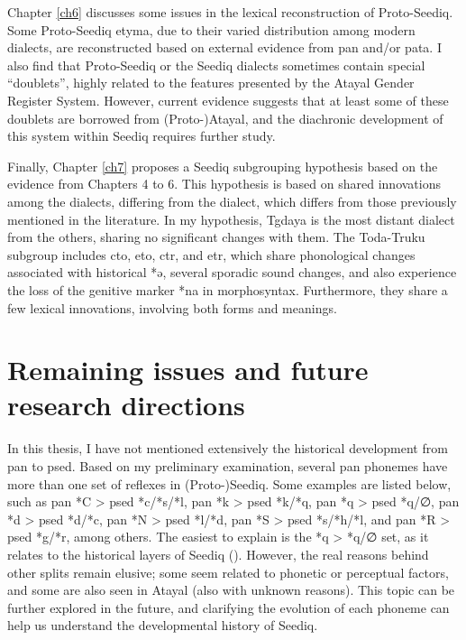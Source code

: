 Chapter \ref{ch6} discusses some issues in the lexical reconstruction of Proto-Seediq. Some Proto-Seediq etyma, due to their varied distribution among modern dialects, are reconstructed based on external evidence from \acl{pan} and/or \acl{pata}. I also find that Proto-Seediq or the Seediq dialects sometimes contain special ``doublets'', highly related to the features presented by the Atayal Gender Register System. However, current evidence suggests that at least some of these doublets are borrowed from (Proto-)Atayal, and the diachronic development of this system within Seediq requires further study.

Finally, Chapter \ref{ch7} proposes a Seediq subgrouping hypothesis based on the evidence from Chapters 4 to 6. This hypothesis is based on shared innovations among the dialects, differing from the dialect, which differs from those previously mentioned in the literature. In my hypothesis, Tgdaya is the most distant dialect from the others, sharing no significant changes with them. The Toda-Truku subgroup includes \acl{cto}, \acl{eto}, \acl{ctr}, and \acl{etr}, which share phonological changes associated with historical *ə, several sporadic sound changes, and also experience the loss of the genitive marker *na in morphosyntax. Furthermore, they share a few lexical innovations, involving both forms and meanings.

\section{Remaining issues and future research directions}

In this thesis, I have not mentioned extensively the historical development from \acl{pan} to \acl{psed}. Based on my preliminary examination, several \ac{pan} phonemes have more than one set of reflexes in (Proto-)Seediq. Some examples are listed below, such as \ac{pan} *C > \ac{psed} *c/*s/*l, \ac{pan} *k > \ac{psed} *k/*q, \ac{pan} *q > \ac{psed} *q/∅, \ac{pan} *d > \ac{psed} *d/*c, \ac{pan} *N > \ac{psed} *l/*d, \ac{pan} *S > \ac{psed} *s/*h/*l, and \ac{pan} *R > \ac{psed} *g/*r, among others. The easiest to explain is the *q > *q/∅ set, as it relates to the historical layers of Seediq (\cite{song2024sedq}). However, the real reasons behind other splits remain elusive; some seem related to phonetic or perceptual factors, and some are also seen in Atayal (also with unknown reasons). This topic can be further explored in the future, and clarifying the evolution of each phoneme can help us understand the developmental history of Seediq.

